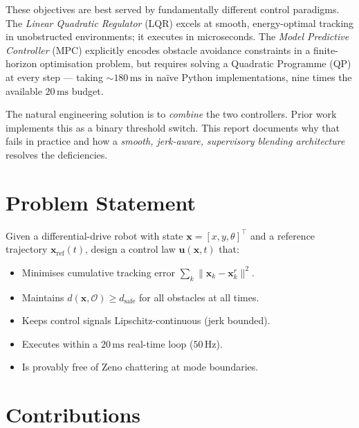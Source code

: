 \documentclass[12pt,a4paper,oneside]{report}
\begin{document}
These objectives are best served by fundamentally different control paradigms.
The \textit{Linear Quadratic Regulator} (LQR) excels at smooth,
energy-optimal tracking in unobstructed environments; it executes in
microseconds. The \textit{Model Predictive Controller} (MPC) explicitly
encodes obstacle avoidance constraints in a finite-horizon optimisation
problem, but requires solving a Quadratic Programme (QP) at every step ---
taking \(\sim\!180\,\text{ms}\) in na\"{i}ve Python implementations, nine
times the available \(20\,\text{ms}\) budget.

The natural engineering solution is to \textit{combine} the two controllers.
Prior work implements this as a binary threshold switch. This report documents
why that fails in practice and how a \textit{smooth, jerk-aware, supervisory
blending architecture} resolves the deficiencies.

\section{Problem Statement}

Given a differential-drive robot with state
\(\mathbf{x} = [x,y,\theta]^\top\) and a reference trajectory
\(\mathbf{x}_{\mathrm{ref}}(t)\), design a control law
\(\mathbf{u}(\mathbf{x},t)\) that:
\begin{itemize}
  \item Minimises cumulative tracking error
    \(\sum_k\|\mathbf{x}_k - \mathbf{x}^r_k\|^2\).
  \item Maintains \(d(\mathbf{x},\mathcal{O}) \geq d_{\mathrm{safe}}\)
    for all obstacles at all times.
  \item Keeps control signals Lipschitz-continuous (jerk bounded).
  \item Executes within a \(20\,\text{ms}\) real-time loop (\(50\,\text{Hz}\)).
  \item Is provably free of Zeno chattering at mode boundaries.
\end{itemize}

\section{Contributions}
\end{document}

